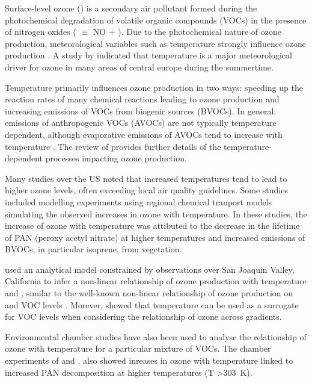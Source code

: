 Surface-level ozone () is a secondary air pollutant formed during the photochemical degradation of volatile organic compounds (VOCs) in the presence of nitrogen oxides ( $\equiv$ NO + ).
Due to the photochemical nature of ozone production, meteorological variables such as temperature strongly influence ozone production \citep{Jacob:2009}.
A study by \citet{Otero:2016} indicated that temperature is a major meteorological driver for ozone in many areas of central europe during the summertime.

Temperature primarily influences ozone production in two ways: speeding up the reaction rates of many chemical reactions leading to ozone production and increasing emissions of VOCs from biogenic sources (BVOCs).
In general, emissions of anthropogenic VOCs (AVOCs) are not typically temperature dependent, although evaporative emissions of AVOCs tend to increase with temperature \citep{Rubin:2006}.
The review of \citet{Pusede:2015} provides further details of the temperature-dependent processes impacting ozone production.

Many studies over the US \citep{Sillman:1995a, Dawson:2007, Pusede:2014} noted that increased temperatures tend to lead to higher ozone levels, often exceeding local air quality guidelines.
Some studies \citep{Sillman:1995a, Dawson:2007} included modelling experiments using regional chemical tranport models simulating the observed increases in ozone with temperature.
In these studies, the increase of ozone with temperature was attibuted to the decrease in the lifetime of PAN (peroxy acetyl nitrate) at higher temperatures and increased emissions of BVOCs, in particular isoprene, from vegetation.

\citet{Pusede:2014} used an analytical model constrained by observations over San Joaquin Valley, California to infer a non-linear relationship of ozone production with temperature and , similar to the well-known non-linear relationship of ozone production on  and VOC levels \citep{Sillman:1999}.
Morever, \citet{Pusede:2014} showed that temperature can be used as a surrogate for VOC levels when considering the relationship of ozone across  gradients.

Environmental chamber studies have also been used to analyse the relationship of ozone with temperature for a particular mixture of VOCs.
The chamber experiments of \citet{Carter:1979} and \citet{Hatakeyama:1991}, also showed inreases in ozone with temperature linked to increased PAN decomposition at higher temperatures (T \textgreater 303~K).

